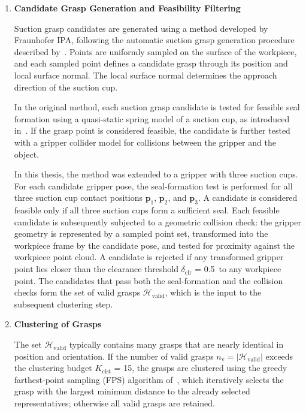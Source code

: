 \begin{enumerate}
    \item \textbf{Candidate Grasp Generation and Feasibility Filtering}

    Suction grasp candidates are generated using a method developed by Fraunhofer IPA, following the
    automatic suction grasp generation procedure described by~\cite{Kleeberger}. Points are
    uniformly sampled on the surface of the workpiece, and each sampled point defines a candidate
    grasp through its position and local surface normal. The local surface normal determines the
    approach direction of the suction cup.

    In the original method, each suction grasp candidate is tested for feasible seal formation using
    a quasi-static spring model of a suction cup, as introduced in~\cite{SC_quasi_static}. If the
    grasp point is considered feasible, the candidate is further tested with a gripper collider
    model for collisions between the gripper and the object.

    In this thesis, the method was extended to a gripper with three suction cups. For each candidate
    gripper pose, the seal-formation test is performed for all three suction cup contact positions
    $\mathbf{p}_1$, $\mathbf{p}_2$, and $\mathbf{p}_3$. A candidate is considered feasible only if
    all three suction cups form a sufficient seal. Each feasible candidate is subsequently subjected
    to a geometric collision check: the gripper geometry is represented by a sampled point set,
    transformed into the workpiece frame by the candidate pose, and tested for proximity against the
    workpiece point cloud. A candidate is rejected if any transformed gripper point lies closer than
    the clearance threshold $\delta_{\mathrm{clr}}$ = 0.5\, to any workpiece point. The
    candidates that pass both the seal-formation and the collision checks form the set of valid
    grasps $\mathcal{H}_{\mathrm{valid}}$, which is the input to the subsequent clustering step.

    \item \textbf{Clustering of Grasps}

    The set $\mathcal{H}_{\mathrm{valid}}$ typically contains many grasps that are nearly identical in
    position and orientation. If the number of valid grasps
    $n_{\mathrm{v}} = |\mathcal{H}_{\mathrm{valid}}|$ exceeds the clustering budget $K_{\mathrm{clst}}$ = 15,
    the grasps are clustered using the greedy farthest-point sampling (FPS) algorithm
    of~\cite{gonzalez1985clustering}, which iteratively selects the grasp with the largest minimum
    distance to the already selected representatives; otherwise all valid grasps are retained.


\end{enumerate}
